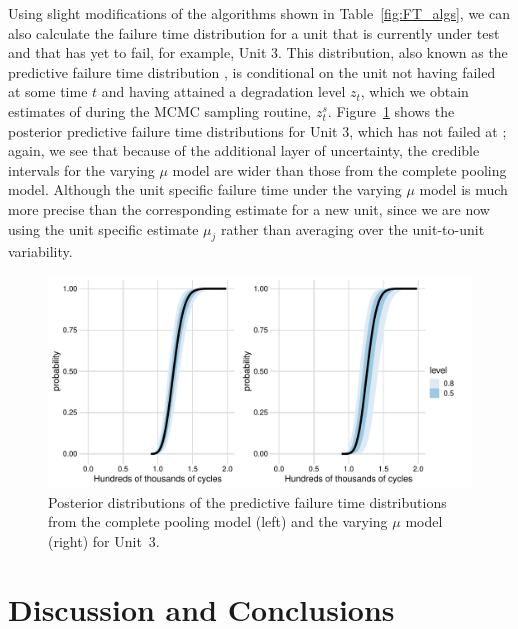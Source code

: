 \documentclass{article}
\begin{document}
Using slight modifications of the algorithms shown in Table~\ref{fig:FT_algs}, we can also calculate the failure time distribution for a unit that is currently under test and that has yet to fail, for example, Unit 3. This distribution, also known as the predictive failure time distribution \citep{lawless_covariates_2004}, is conditional on the unit not having failed at some time $t$ and having attained a degradation level $z_t$, which we obtain estimates of during the MCMC sampling routine, $z^s_t$. Figure~\ref{fig:FT_CP_VM_U3} shows the posterior predictive failure time distributions for Unit 3, which has not failed at ; again, we see that because of the additional layer of uncertainty, the credible intervals for the varying $\mu$ model are wider than those from the complete pooling model. Although the unit specific failure time under the varying $\mu$ model is much more precise than the corresponding estimate for a new unit, since we are now using the unit specific estimate $\mu_j$ rather than averaging over the unit-to-unit variability.

\begin{figure}[thbp]
    \centering
    \includegraphics[width=0.95\columnwidth]{../figures/FT_dist_Unit3.pdf}
    \caption{Posterior distributions of the predictive failure time distributions from the complete pooling model (left) and the varying $\mu$ model (right) for Unit~3.}
    \label{fig:FT_CP_VM_U3}
\end{figure}

\section{Discussion and Conclusions}\label{sec:disc_concl}
\end{document}
